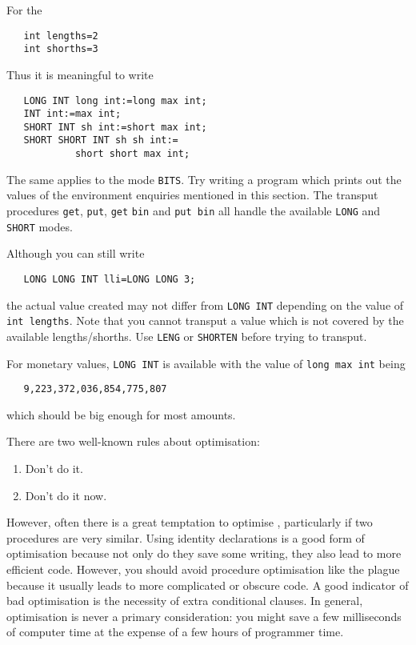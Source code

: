 For the 
\begin{verbatim}
   int lengths=2
   int shorths=3
\end{verbatim}
\noindent
Thus it is meaningful to write
\begin{verbatim}
   LONG INT long int:=long max int;
   INT int:=max int;
   SHORT INT sh int:=short max int;
   SHORT SHORT INT sh sh int:=
            short short max int;
\end{verbatim}
\noindent
The same applies to the mode \verb|BITS|. Try writing a program which
prints out the values of the environment enquiries mentioned in this
section. The transput procedures \verb|get|, \verb|put|, \verb|get|
\verb|bin| and \verb|put bin| all handle the available \verb|LONG|
and \verb|SHORT| modes.

Although you can still write
\begin{verbatim}
   LONG LONG INT lli=LONG LONG 3;
\end{verbatim}
\noindent
the actual value created may not differ from \verb|LONG INT| depending
on the value of \verb|int lengths|. Note that you cannot transput a
value which is not covered by the available lengths/shorths. Use
\verb|LENG| or \verb|SHORTEN| before trying to transput.

For monetary values, \verb|LONG INT| is available with the value of
\verb|long max int| being
\begin{verbatim}
   9,223,372,036,854,775,807
\end{verbatim}
\noindent
which should be big enough for most amounts.

There are two well-known rules about optimisation:
\begin{enumerate}
\item Don't do it.
\item Don't do it now.
\end{enumerate}
However, often there is a great temptation to optimise
, particularly if two procedures are
very similar.  Using identity declarations is a good form of
optimisation because not only do they save some writing, they also
lead to more efficient code.  However, you should avoid procedure
optimisation like the plague because it usually leads to more
complicated or obscure code.  A good indicator of bad optimisation is
the necessity of extra conditional clauses.  In general, optimisation
is never a primary consideration: you might save a few milliseconds
of computer time at the expense of a few hours of programmer time.

